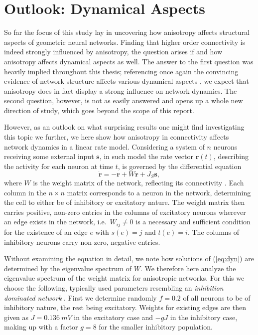 \chapter{Outlook: Dynamical Aspects}\label{ch:dynamical_aspects}

So far the focus of this study lay in uncovering how anisotropy
affects structural aspects of geometric neural networks. Finding that
higher order connectivity is indeed strongly influenced by anisotropy,
the question arises if and how anisotropy affects dynamical aspects as
well. The answer to the first question was heavily implied throughout
this thesis; referencing once again the convincing evidence of network
structure affects various dynamical aspects \parencite{Pernice2011,
  Zhao2011}, we expect that anisotropy does in fact display a strong
influence on network dynamics. The second question, however, is not
as easily answered and opens up a whole new direction of study, which
goes beyond the scope of this report. 

However, as an outlook on what surprising results one might find
investigating this topic we further, we here show how anisotropy in
connectivity affects network dynamics in a linear rate
model. Considering a system of $n$ neurons receiving some external
input $\mathbf{s}$, in such  model the rate vector
$\mathbf{r}(t)$, describing the activity for each neuron at time $t$,
is governed by the differential equation
\begin{equation}
  \dot{\mathbf{r}}  = -\mathbf{r} + W\mathbf{r} + J_S \mathbf{s},
\label{eq:dyn}
\end{equation}
where $W$ is the weight matrix of the network, reflecting its
connectivity \parencite{Sadeh2014}. Each column in the $n \times n$
matrix corresponds to a neuron in the network, determining the cell to
either be of inhibitory or excitatory nature. The weight matrix
then carries positive, non-zero entries in the columns of excitatory
neurons wherever an edge exists in the network, i.e.\ $W_{ij} \neq
0$ is a necessary and sufficient condition for the existence of an
edge $e$ with $s(e) = j$ and $t(e) = i$. The columns of inhibitory
neurons carry non-zero, negative entries.

Without examining the equation in detail, we note how solutions of
(\ref{eq:dyn}) are determined by the eigenvalue spectrum of $W$. We
therefore here analyze the eigenvalue spectrum of the weight matrix
for anisotropic networks. For this we choose the following, typically
used parameters resembling an \textit{inhibition dominated
  network} \parencite{Brunel2000, Sadeh2014}. First we determine
randomly $f=0.2$ of all neurons to be of inhibitory nature, the rest
being excitatory. Weights for existing edges are then given as
$J=\SI{0.136}{mV}$ in the excitatory case and $-gJ$ in the inhibitory
case, making up with a factor $g=8$ for the smaller inhibitory population.


